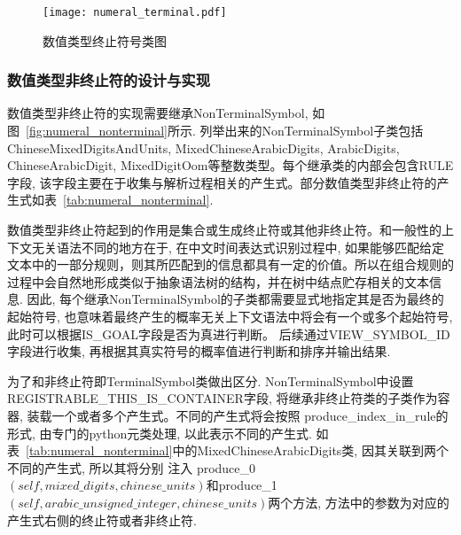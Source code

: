 \begin{figure}[h]
    \centering
    \texttt{[image: numeral\_terminal.pdf]}
    \caption{数值类型终止符号类图}
    \label{fig:numeral_terminal}
\end{figure}


\subsubsection{数值类型非终止符的设计与实现}

数值类型非终止符的实现需要继承NonTerminalSymbol, 如图~\ref{fig:numeral_nonterminal}所示.
列举出来的NonTerminalSymbol子类包括ChineseMixedDigitsAndUnits, MixedChineseArabicDigits, ArabicDigits, ChineseArabicDigit, MixedDigitOom等整数类型。每个继承类的内部会包含RULE字段, 该字段主要在于收集与解析过程相关的产生式。部分数值类型非终止符的产生式如表~\ref{tab:numeral_nonterminal}.

数值类型非终止符起到的作用是集合或生成终止符或其他非终止符。和一般性的上下文无关语法不同的地方在于, 在中文时间表达式识别过程中, 如果能够匹配给定文本中的一部分规则，则其所匹配到的信息都具有一定的价值。所以在组合规则的过程中会自然地形成类似于抽象语法树的结构，并在树中结点贮存相关的文本信息.
因此, 每个继承NonTerminalSymbol的子类都需要显式地指定其是否为最终的起始符号, 也意味着最终产生的概率无关上下文语法中将会有一个或多个起始符号, 此时可以根据IS\_GOAL字段是否为真进行判断。
后续通过VIEW\_SYMBOL\_ID字段进行收集, 再根据其真实符号的概率值进行判断和排序并输出结果.

为了和非终止符即TerminalSymbol类做出区分.
NonTerminalSymbol中设置REGISTRABLE\_THIS\_IS\_CONTAINER字段,
将继承非终止符类的子类作为容器, 装载一个或者多个产生式。不同的产生式将会按照
produce\_index\_in\_rule的形式, 由专门的python元类处理, 以此表示不同的产生式. 如表~\ref{tab:numeral_nonterminal}中的MixedChineseArabicDigits类, 因其关联到两个不同的产生式, 所以其将分别
注入 produce\_0$\left(self, mixed\_digits, chinese\_units\right)$和produce\_1$\left(self, arabic\_unsigned\_integer, chinese\_units\right)$两个方法, 方法中的参数为对应的产生式右侧的终止符或者非终止符.


